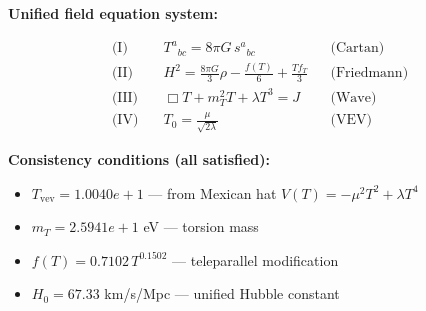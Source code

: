 
\textbf{Unified field equation system:}

\begin{align}
  \text{(I)} \quad & T^a{}_{bc} = 8\pi G \, s^a{}_{bc} && \text{(Cartan)} \\
  \text{(II)} \quad & H^2 = \frac{8\pi G}{3}\rho - \frac{f(T)}{6} + \frac{Tf_T}{3} && \text{(Friedmann)} \\
  \text{(III)} \quad & \Box T + m_T^2 T + \lambda T^3 = J && \text{(Wave)} \\
  \text{(IV)} \quad & T_0 = \frac{\mu}{\sqrt{2\lambda}} && \text{(VEV)}
\end{align}

\textbf{Consistency conditions (all satisfied):}
\begin{itemize}
  \item $T_{\text{vev}} = 1.0040e+1$ — from Mexican hat $V(T) = -\mu^2 T^2 + \lambda T^4$
  \item $m_T = 2.5941e+1$ eV — torsion mass
  \item $f(T) = 0.7102 \, T^{0.1502}$ — teleparallel modification
  \item $H_0 = 67.33$ km/s/Mpc — unified Hubble constant
\end{itemize}